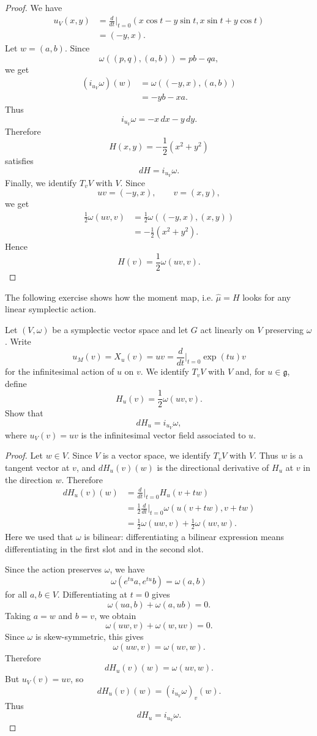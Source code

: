 \begin{proof}
We have
$$
\begin{aligned}
u_V(x,y)
&=
\frac{d}{dt}\Big|_{t=0}
(x\cos t-y\sin t,
x\sin t+y\cos t)\\
&=(-y,x).
\end{aligned}
$$
Let $w=(a,b)$. Since
$$
\omega((p,q),(a,b))=pb-qa,
$$
we get
$$
\begin{aligned}
(i_{u_V}\omega)(w)
&=\omega((-y,x),(a,b))\\
&=-yb-xa.
\end{aligned}
$$
Thus
$$
i_{u_V}\omega=-x\,dx-y\,dy.
$$
Therefore
$$
H(x,y)=-\frac{1}{2}(x^2+y^2)
$$
satisfies
$$
dH=i_{u_V}\omega.
$$
Finally, we identify $T_vV$ with $V$. Since
$$
uv=(-y,x),\qquad v=(x,y),
$$
we get
$$
\begin{aligned}
\frac{1}{2}\omega(uv,v)
&=
\frac{1}{2}\omega((-y,x),(x,y))\\
&=
-\frac{1}{2}(x^2+y^2).
\end{aligned}
$$
Hence
$$
H(v)=\frac{1}{2}\omega(uv,v).
$$
\end{proof}

\noindent
The following exercise shows
how the moment map, i.e.
$\hat{\mu}=H$ looks for any
linear symplectic action.

\begin{exercise}
\label{exercise-linear-moment-map}
Let $(V,\omega)$ be a symplectic vector space
and let $G$ act linearly on $V$ preserving
$\omega$.
Write
$$
u_M(v)=X_u(v)=uv=\frac{d}{dt}\Big|_{t=0}
\exp(tu)v
$$
for the infinitesimal action of $u$ on $v$.
We identify $T_vV$ with $V$ and,
for $u \in \mathfrak{g}$, define
$$
H_u(v)=\frac{1}{2}\omega(uv,v).
$$
Show that
$$
dH_u=i_{u_V}\omega,
$$
where $u_V(v)=uv$ is the infinitesimal
vector field associated to $u$.
\end{exercise}
\begin{proof}
Let $w \in V$. Since $V$ is a vector
space, we identify $T_vV$ with $V$.
Thus $w$ is a tangent vector at $v$,
and $dH_u(v)(w)$ is the directional
derivative of $H_u$ at $v$ in the
direction $w$. Therefore
$$
\begin{aligned}
dH_u(v)(w)
&=
\frac{d}{dt}\Big|_{t=0}
H_u(v+tw)\\
&=
\frac{1}{2}
\frac{d}{dt}\Big|_{t=0}
\omega(u(v+tw),v+tw)\\
&=
\frac{1}{2}\omega(uw,v)
+
\frac{1}{2}\omega(uv,w).
\end{aligned}
$$
Here we used that $\omega$ is bilinear:
differentiating a bilinear expression
means differentiating in the first slot
and in the second slot.

Since the action preserves $\omega$,
we have
$$
\omega(e^{tu}a,e^{tu}b)=\omega(a,b)
$$
for all $a,b \in V$.
Differentiating at $t=0$ gives
$$
\omega(ua,b)+\omega(a,ub)=0.
$$
Taking $a=w$ and $b=v$, we obtain
$$
\omega(uw,v)+\omega(w,uv)=0.
$$
Since $\omega$ is skew-symmetric, this
gives
$$
\omega(uw,v)=\omega(uv,w).
$$
Therefore
$$
dH_u(v)(w)=\omega(uv,w).
$$
But $u_V(v)=uv$, so
$$
dH_u(v)(w)
=
(i_{u_V}\omega)_v(w).
$$
Thus
$$
dH_u=i_{u_V}\omega.
$$
\end{proof}

